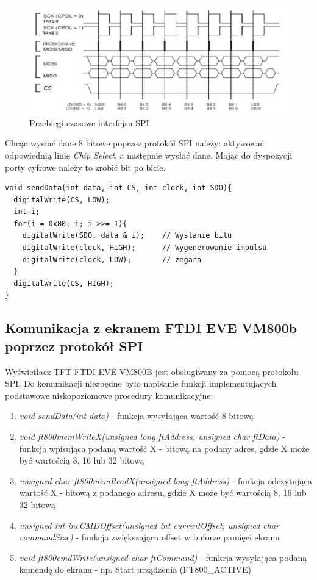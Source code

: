 \documentclass{xmgr}
\begin{document}
\begin{figure}[!h]
    \centering
    \includegraphics[height=0.25\textheight]{images/spi.png}
    \caption{Przebiegi czasowe interfejsu SPI}
\end{figure}

Chcąc wysłać dane 8 bitowe poprzez protokół SPI należy: aktywować odpowiednią linię \emph{Chip Select}, a następnie wysłać dane. Mając do dyspozycji porty cyfrowe należy to zrobić bit po bicie.
\begin{lstlisting}[label=bot-dirs-alg,caption=Wysłanie danych 8 bitowych za pomocą protokołu SPI]
void sendData(int data, int CS, int clock, int SDO){
  digitalWrite(CS, LOW);
  int i;
  for(i = 0x80; i; i >>= 1){
    digitalWrite(SDO, data & i);	// Wyslanie bitu
    digitalWrite(clock, HIGH);		// Wygenerowanie impulsu
    digitalWrite(clock, LOW);		// zegara
  }
  digitalWrite(CS, HIGH);
}
\end{lstlisting}

\subsection{Komunikacja z ekranem FTDI EVE VM800b poprzez protokół SPI}
Wyświetlacz TFT FTDI EVE VM800B jest obsługiwany za pomocą protokołu SPI. Do komunikacji niezbędne było napisanie funkcji implementujących podstawowe niskopoziomowe procedury komunikacyjne:
\begin{enumerate}
	\item \emph{void sendData(int data)} - funkcja wysyłająca wartość 8 bitową
	\item \emph{void ft800memWriteX(unsigned long ftAddress, unsigned char ftData)} - funkcja wpisująca podaną wartość X - bitową na podany adres, gdzie X może być wartością 8, 16 lub 32 bitową
	\item \emph{unsigned char ft800memReadX(unsigned long ftAddress)} - funkcja odczytująca wartość X - bitową z podanego adresu, gdzie X może być wartością 8, 16 lub 32 bitową
	\item \emph{unsigned int incCMDOffset(unsigned int currentOffset, unsigned char commandSize)} - funkcja zwiększająca offset w buforze pamięci ekranu
	\item \emph{void ft800cmdWrite(unsigned char ftCommand)} - funkcja wysyłająca podaną komendę do ekranu - np. Start urządzenia (FT800\_ACTIVE)
\end{enumerate}
\end{document}
